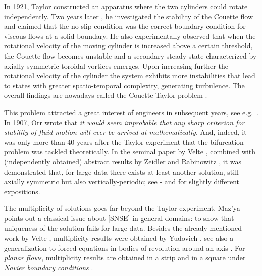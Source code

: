 \documentclass[a4paper,11pt]{amsart}
\numberwithin{equation}{section}
\numberwithin{figure}{section}
\begin{document}
		In 1921, Taylor \cite{taylor1921experiments} constructed an apparatus where the two cylinders could rotate independently.
		Two years later \cite{taylor}, he investigated the stability of the Couette flow and claimed that the no-slip
		condition was the correct boundary condition for viscous flows at a solid boundary.
		He also experimentally observed that when the rotational velocity of the moving cylinder is increased above a certain threshold,
		the Couette flow becomes unstable and a secondary steady state characterized by axially symmetric toroidal vortices emerges. Upon increasing
		further the rotational velocity of the cylinder the system exhibits more instabilities that lead to states with greater spatio-temporal
		complexity, generating turbulence. The overall findings are nowadays called the Couette-Taylor problem \cite{Chossat}.\par
    This problem attracted a great interest of
    engineers in subsequent years, see e.g.\
\cite{alekseenko1999helical,dou2008instability,luccanegro,ludwieg}. In 1907, Orr \cite[p.75]{orr1907stability} wrote that {\it it would seem improbable that any sharp criterion for stability of fluid motion
		will ever be arrived at mathematically}. And, indeed, it was only more than 40 years after the Taylor experiment that the bifurcation problem
	was tackled theoretically.
	In the seminal paper by Velte \cite{velte1966}, combined with (independently obtained) abstract results by Zeidler \cite{zeidler}
	and Rabinowitz \cite{rabinowitz1971,rabinowitz1972}, it was demonstrated that, for large data there exists at least another solution, still axially symmetric but also vertically-periodic;
	see \cite[Theorem 8A]{zeidlerI}-\cite[Theorem 72C]{zeidlerIV} and \cite[Section II.4]{temam2001navier} for slightly different expositions.\par
The multiplicity of solutions goes far beyond the Taylor 
experiment. Maz'ya \cite[Problem 67]{maz2018seventy} points out a classical issue about \eqref{SNSE} in general domains: to show that uniqueness of
the solution fails for large data. Besides the already mentioned work by Velte \cite{velte1966},
multiplicity results were obtained by Yudovich \cite{yudovich1966secondary,yudovich1967example}, see also a generalization to
forced equations in bodies of revolution around an axis \cite[Theorem IX.2.2]{galdi2011introduction}. For {\em planar flows}, multiplicity results are obtained in a strip \cite{golovkin} and in a square under
{\em Navier boundary conditions} \cite{kochuniqueness}.\par
\end{document}
